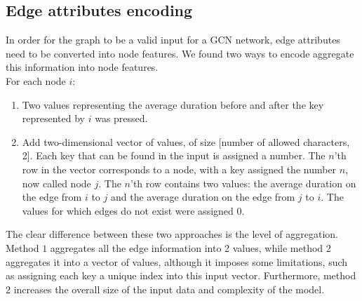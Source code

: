 \subsection{Edge attributes encoding}
In order for the graph to be a valid input for a GCN network, edge attributes need to be converted into node features. We found two ways to encode aggregate this information into node features.\\  
For each node $i$:
\begin{enumerate}
	\item Two values representing the average duration before and after the key represented by $i$ was pressed.
	\item Add two-dimensional vector of values, of size [number of allowed characters, 2]. Each key that can be found in the input is assigned a number. The $n$'th row in the vector corresponds to a node, with a key assigned the number $n$, now called node $j$. The $n$'th row contains two values: the average duration on the edge from $i$ to $j$ and the average duration on the edge from $j$ to $i$. The values for which edges do not exist were assigned 0.
\end{enumerate}
The clear difference between these two approaches is the level of aggregation. Method $1$ aggregates all the edge information into 2 values, while method $2$ aggregates it into a vector of values, although it imposes some limitations, such as assigning each key a unique index into this input vector. Furthermore, method $2$ increases the overall size of the input data and complexity of the model.


